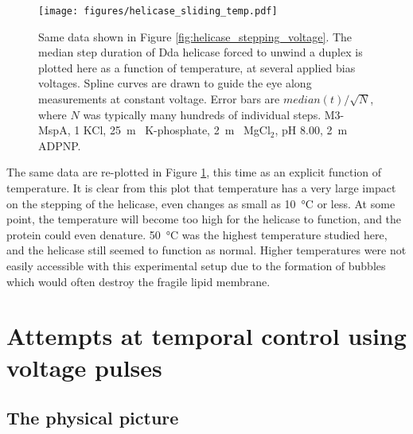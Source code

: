 \begin{figure}[h]
\begin{centering}
\texttt{[image: figures/helicase\_sliding\_temp.pdf]}
\caption[Forced helicase stepping depends on temperature]{Same data shown in Figure \ref{fig:helicase_stepping_voltage}.  The median step duration of Dda helicase forced to unwind a duplex is plotted here as a function of temperature, at several applied bias voltages.  Spline curves are drawn to guide the eye along measurements at constant voltage.  Error bars are $median(t)/\sqrt{N}$, where $N$ was typically many hundreds of individual steps.  M3-MspA, \SI{1}{\Molar} KCl, \SI{25}{\m\Molar} K-phosphate, \SI{2}{\m\Molar} MgCl$_2$, pH \num{8.00}, \SI{2}{\m\Molar} ADPNP.}
\label{fig:helicase_stepping_temp}
\end{centering}
\end{figure}

The same data are re-plotted in Figure \ref{fig:helicase_stepping_temp}, this time as an explicit function of temperature.  It is clear from this plot that temperature has a very large impact on the stepping of the helicase, even changes as small as \SI{10}{\celsius} or less.  At some point, the temperature will become too high for the helicase to function, and the protein could even denature.  \SI{50}{\celsius} was the highest temperature studied here, and the helicase still seemed to function as normal.  Higher temperatures were not easily accessible with this experimental setup due to the formation of bubbles which would often destroy the fragile lipid membrane.


\section{Attempts at temporal control using voltage pulses}

\subsection{The physical picture}

